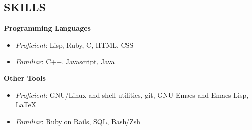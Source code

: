 \documentclass[line,margin]{res}
\begin{document}
\begin{resume}


  \section{SKILLS}
  {\bf\rmfamily Programming Languages}
  \begin{itemize} \itemsep -2pt
  \item \emph{Proficient}: Lisp, Ruby, C, HTML, CSS
  \item \emph{Familiar}: C++, Javascript, Java
  \end{itemize}

  {\bf\rmfamily Other Tools}
  \begin{itemize} \itemsep -2pt
  \item \emph{Proficient}: GNU/Linux and shell utilities, git, GNU Emacs and Emacs Lisp, \LaTeX
  \item \emph{Familiar}: Ruby on Rails, SQL, Bash/Zsh
  \end{itemize}







\end{resume}
\end{document}
